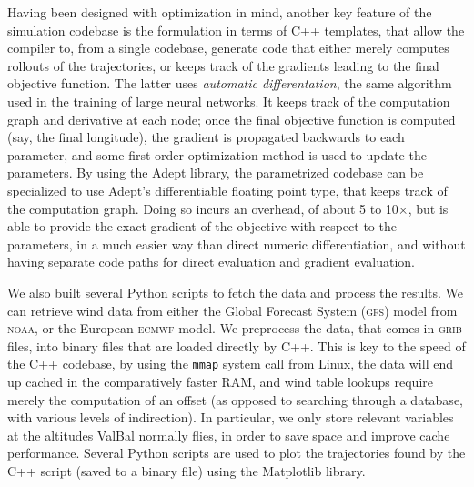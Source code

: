 \documentclass[11pt]{scrartcl} %
\begin{document}
Having been designed with optimization in mind, another key feature of the simulation codebase is the formulation in terms of C++ templates, that allow the compiler to, from a single codebase, generate code that either merely computes rollouts of the trajectories, or keeps track of the gradients leading to the final objective function. The latter uses \emph{automatic differentation}, the same algorithm used in the training of large neural networks. It keeps track of the computation graph and derivative at each node; once the final objective function is computed (say, the final longitude), the gradient is propagated backwards to each parameter, and some first-order optimization method is used to update the parameters. By using the Adept library, the parametrized codebase can be specialized to use Adept's differentiable floating point type, that keeps track of the computation graph. Doing so incurs an overhead, of about 5 to 10$\times$, but is able to provide the exact gradient of the objective with respect to the parameters, in a much easier way than direct numeric differentiation, and without having separate code paths for direct evaluation and gradient evaluation.

We also built several Python scripts to fetch the data and process the results. We can retrieve wind data from either the Global Forecast System (\textsc{gfs}) model from \textsc{noaa}, or the European \textsc{ecmwf} model. We preprocess the data, that comes in \textsc{grib} files, into binary files that are loaded directly by C++. This is key to the speed of the C++ codebase, by using the \texttt{mmap} system call from Linux, the data will end up cached in the comparatively faster RAM, and wind table lookups require merely the computation of an offset (as opposed to searching through a database, with various levels of indirection). In particular, we only store relevant variables at the altitudes ValBal normally flies, in order to save space and improve cache performance. Several Python scripts are used to plot the trajectories found by the C++ script (saved to a binary file) using the Matplotlib library.

\newpage
\printbibliography
\end{document}
